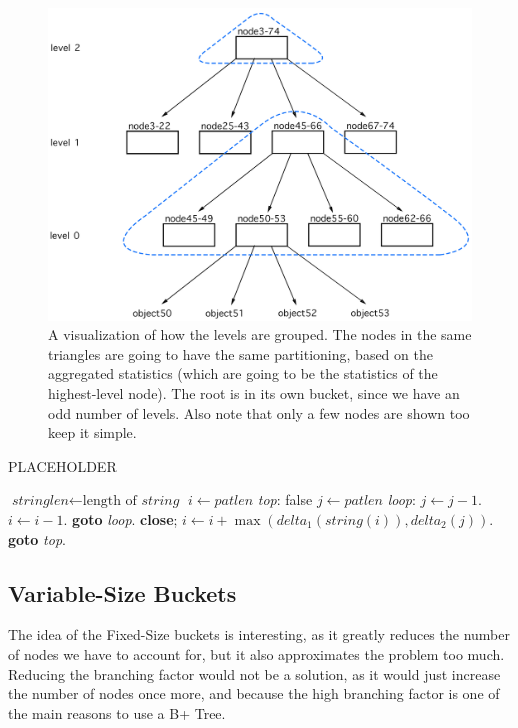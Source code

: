 \begin{figure}[!htb]
  \centering
  \includegraphics[width=\textwidth,height=\textheight,keepaspectratio]{img/grouped-levels.png}
  \caption[caption]{ A visualization of how the levels are grouped. The nodes in the same triangles are going to have the same partitioning, based on the aggregated statistics (which are going to be the statistics of the highest-level node). The root is in its own bucket, since we have an odd number of levels. Also note that only a few nodes are shown too keep it simple.}
  \label{fig:Fixed-Size-buckets}
\end{figure}

\begin{algorithm}
  \caption{PLACEHOLDER}\label{alg:fixed-size}
  \begin{algorithmic}[1]
  \State $\textit{stringlen} \gets \text{length of }\textit{string}$
  \State $i \gets \textit{patlen}$
  \State \emph{top}:
   \Return false
  \EndIf
  \State $j \gets \textit{patlen}$
  \State \emph{loop}:
  \State $j \gets j-1$.
  \State $i \gets i-1$.
  \State \textbf{goto} \emph{loop}.
  \State \textbf{close};
  \EndIf
  \State $i \gets i+\max(\textit{delta}_1(\textit{string}(i)),\textit{delta}_2(j))$.
  \State \textbf{goto} \emph{top}.
  \EndProcedure
  \end{algorithmic}
  \end{algorithm}

\subsection{Variable-Size Buckets}\label{sec:Variable-Size buckets}
The idea of the Fixed-Size buckets is interesting, as it greatly reduces the number of nodes we have to account for, but it also approximates the problem too much. Reducing the branching factor would not be a solution, as it would just increase the number of nodes once more, and because the high branching factor is one of the main reasons to use a B+ Tree. 


